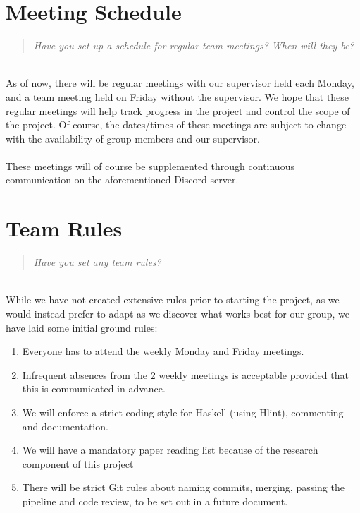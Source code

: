 \documentclass{report}
\newcommand{\teamq}[1]{\begin{quote}
    \large\textit{#1}
\end{quote}}
\begin{document}
\section*{Meeting Schedule}
\teamq{Have you set up a schedule for regular team meetings? When will they be?}
\\
As of now, there will be regular meetings with our supervisor held each Monday, and a team meeting held on Friday without the supervisor. We hope that these regular meetings will help track progress in the project and control the scope of the project. Of course, the dates/times of these meetings are subject to change with the availability of group members and our supervisor.
\\
\\These meetings will of course be supplemented through continuous communication on the aforementioned Discord server.

\section*{Team Rules}
\teamq{Have you set any team rules?}
\\
While we have not created extensive rules prior to starting the project, as we would instead prefer to adapt as we discover what works best for our group, we have laid some initial ground rules:

\begin{enumerate}
    \setlength\itemsep{0em}
    \item Everyone has to attend the weekly Monday and Friday meetings.
    \item Infrequent absences from the 2 weekly meetings is acceptable provided that this is communicated in advance.
    \item We will enforce a strict coding style for Haskell (using Hlint), commenting and documentation.
    \item We will have a mandatory paper reading list because of the research component of this project
    \item There will be strict Git rules about naming commits, merging, passing the pipeline and code review, to be set out in a future document.
\end{enumerate}
\end{document}
